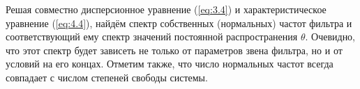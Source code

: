 Решая совместно дисперсионное уравнение (\ref{eq:3.4}) и характеристическое уравнение (\ref{eq:4.4}), найдём спектр собственных (нормальных) частот фильтра и соответствующий ему спектр значений постоянной распространения $\theta$. Очевидно, что этот спектр будет зависеть не только от параметров звена фильтра, но и от условий на его концах. Отметим также, что число нормальных частот всегда совпадает с числом степеней свободы системы.



